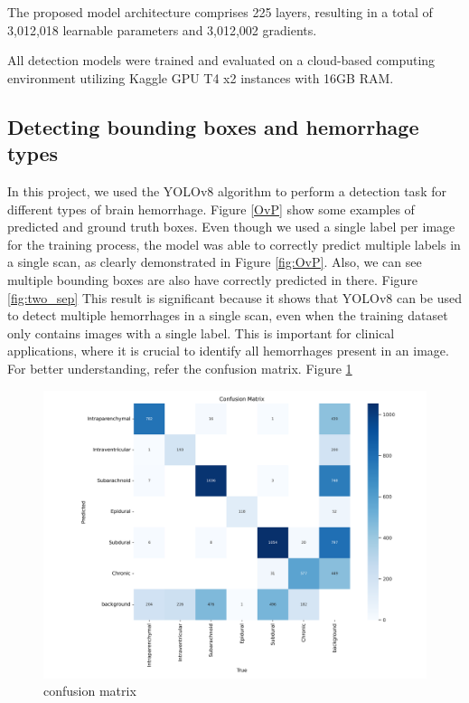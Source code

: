 \documentclass[Print]{../Style/isecure-v24}
\begin{document}
The proposed model architecture comprises 225 layers, resulting in a total of 3,012,018 learnable parameters and 3,012,002 gradients.

All detection models were trained and evaluated on a cloud-based computing environment utilizing Kaggle GPU T4 x2 instances with 16GB RAM.

\subsection{Detecting bounding boxes and hemorrhage types} \label{sec:bounding box detect}

In this project, we used the YOLOv8 algorithm to perform a detection task for different types of brain hemorrhage. Figure \ref{OvP} show some examples of predicted and ground truth boxes.
Even though we used a single label per image for the training process, the model was able to correctly predict multiple labels in a single scan, as clearly demonstrated in Figure \ref{fig:OvP}. Also, we can see multiple bounding boxes are also have correctly predicted in there. Figure \ref{fig:two_sep}
This result is significant because it shows that YOLOv8 can be used to detect multiple hemorrhages in a single scan, even when the training dataset only contains images with a single label. This is important for clinical applications, where it is crucial to identify all hemorrhages present in an image. For better understanding, refer the confusion matrix. Figure \ref{fig:cm}

{\begin{figure}[h]
    \centering
    \includegraphics[width=1.0\linewidth]{ISeCure Draft/Images/cm.png}
    \captionsetup{font=small}
    \caption{confusion matrix}
    \label{fig:cm}
\end{figure}}
\end{document}
